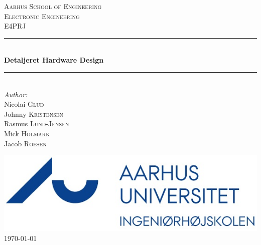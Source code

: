 \newcommand{\HRule}{\rule{\linewidth}{0.5mm}} %

\begin{center} %
 

\textsc{\LARGE Aarhus School of Engineering}\\[1.5cm] %
\textsc{\Large Electronic Engineering}\\[0.5cm] %
\textsc{\large E4PRJ}\\[0.5cm] %


\HRule \\[0.4cm]
{ \huge \bfseries Detaljeret Hardware Design}\\[0.4cm] %
\HRule \\[1.5cm]
 

\Large \emph{Author:}\\
Nicolai \textsc{Glud}\\ %
Johnny \textsc{Kristensen}\\
Rasmus \textsc{Lund-Jensen}\\
Mick \textsc{Holmark}\\
Jacob \textsc{Roesen}\\

 

\vfill %

\includegraphics{billeder/iha-logo}\\[1cm] %

{\large \today}\\[3cm] %
\end{center}
